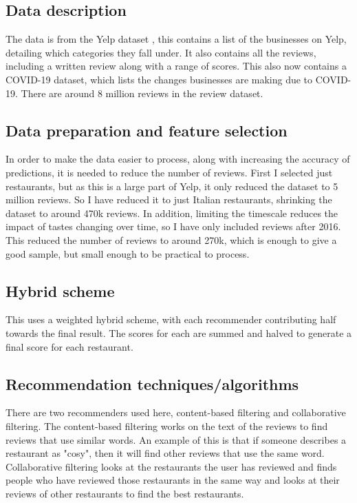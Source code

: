 \documentclass[conference]{IEEEtran}
\begin{document}
\subsection{Data description}

The data is from the Yelp dataset \cite{b1}, this contains a list of the businesses on Yelp, detailing which categories they fall under. It also contains all the reviews, including a written review along with a range of scores. This also now contains a COVID-19 dataset, which lists the changes businesses are making due to COVID-19. There are around 8 million reviews in the review dataset.

\subsection{Data preparation and feature selection}

In order to make the data easier to process, along with increasing the accuracy of predictions, it is needed to reduce the number of reviews. First I selected just restaurants, but as this is a large part of Yelp, it only reduced the dataset to 5 million reviews. So I have reduced it to just Italian restaurants, shrinking the dataset to around 470k reviews. In addition, limiting the timescale reduces the impact of tastes changing over time, so I have only included reviews after 2016. This reduced the number of reviews to around 270k, which is enough to give a good sample, but small enough to be practical to process.

\subsection{Hybrid scheme}

This uses a weighted hybrid scheme, with each recommender contributing half towards the final result. The scores for each are summed and halved to generate a final score for each restaurant.

\subsection{Recommendation techniques/algorithms}

There are two recommenders used here, content-based filtering and collaborative filtering. The content-based filtering works on the text of the reviews to find reviews that use similar words. An example of this is that if someone describes a restaurant as "cosy", then it will find other reviews that use the same word. Collaborative filtering looks at the restaurants the user has reviewed and finds people who have reviewed those restaurants in the same way and looks at their reviews of other restaurants to find the best restaurants.
\end{document}
